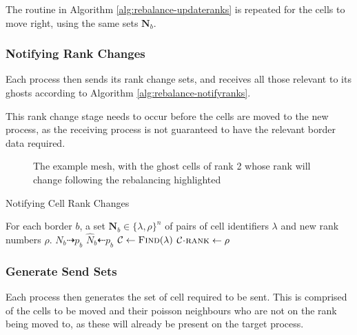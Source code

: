 \documentclass{IIBproject}
\newcommand{\grpath}{../../build/report/movecells}
\newcommand{\vect}[1]{\bm{#1}}
\newcommand{\dra}{\dashrightarrow}
\newcommand{\dla}{\dashleftarrow}
\newcommand{\acc}{{\mkern 0.5mu\cdot\mkern 0.5mu}}
\begin{document}
The routine in Algorithm \ref{alg:rebalance-updateranks} is repeated for the cells to move right, using the same sets $\vect{N}_b$.


\subsubsection{Notifying Rank Changes}
\label{sec:rebalancing-notifyrank}

Each process then sends its rank change sets, and receives all those relevant to its ghosts according to Algorithm \ref{alg:rebalance-notifyranks}. 

This rank change stage needs to occur before the cells are moved to the new process, as the receiving process is not guaranteed to have the relevant border data required. 

\begin{figure}[H]
	\label{fig:rebalance-notify}
	\caption{The example mesh, with the ghost cells of rank 2 whose rank will change following the rebalancing highlighted}
	
\end{figure}

\begin{algorithm}[H]
\caption{Notifying Cell Rank Changes}
\label{alg:rebalance-notifyranks}

\begin{algorithmic}
\Require For each border $b$, a set $\vect{N}_b \in \{\lambda,\rho\}^n$ of pairs of cell identifiers $\lambda$ and new rank numbers $\rho$.
\Statex
{}
	\Send $N_b \dra p_b$
\EndFor
\Statex
{}
	\Recv $\hat N_b \dla p_b$
		\State $\mathcal{C}\gets\textproc{Find}(\lambda)$
		\State $\mathcal{C}\acc\textproc{rank} \gets \rho$
	\EndFor
\EndFor
\end{algorithmic}
\end{algorithm}


\subsubsection{Generate Send Sets}
\label{sec:rebalancing-gensendset}

Each process then generates the set of cell required to be sent. This is comprised of the cells to be moved and their poisson neighbours who are not on the rank being moved to, as these will already be present on the target process.
\end{document}
